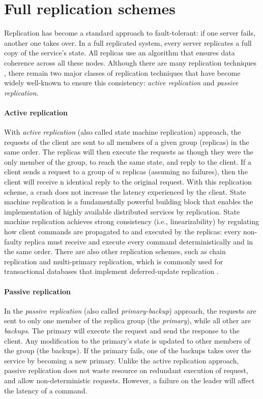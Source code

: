 \section{Full replication schemes}

Replication has become a standard approach to fault-tolerant: if one server
fails, another one takes over. In a full replicated system, every server
replicates a full copy of the service's state. All replicas use an algorithm
that ensures data coherence across all these nodes. Although there are many
replication techniques \cite{Replication:book}, there remain two major classes
of replication techniques that have become widely well-known to ensure this
consistency: \emph{active replication} and \emph{passive replication}.


\paragraph{Active replication} With \emph{active replication} (also called
state machine replication) approach, the requests of the client are sent to all
members of a given group (replicas) in the same order. The replicas will then
execute the requests as though they were the only member of the group, to reach
the same state, and reply to the client. If a client sends a request to a group
of $n$ replicas (assuming no failures), then the client will receive n identical
reply to the original request. With this replication scheme, a crash does not
increase the latency experienced by the client. State machine replication is a
fundamentally powerful building block that enables the implementation of highly
available distributed services by replication. State machine replication
achieves strong consistency (i.e., linearizability) by regulating how client
commands are propagated to and executed by the replicas: every non-faulty
replica must receive and execute every command deterministically and in the same
order. There are also other replication schemes, such as chain replication \cite
{chainreplication, chainreplication:byzantine} and multi-primary replication,
which is commonly used for transactional databases that implement
deferred-update replication \cite{sciascia2012sdur, Replication:book,
chundi96dur}.

\paragraph{Passive replication} In the \emph{passive replication} (also called
\emph{primary-backup}) approach, the requests are sent to only one member of the
replica group (the \emph{primary}), while all other are \emph{backups}. The
primary will execute the request and send the response to the client. Any
modification to the primary's state is updated to other members of the group
(the backups). If the primary fails, one of the backups takes over the service
by becoming a new primary. Unlike the active replication approach, passive
replication does not waste resource on redundant execution of request, and allow
non-deterministic requests. However, a failure on the leader will affect the
latency of a command.

